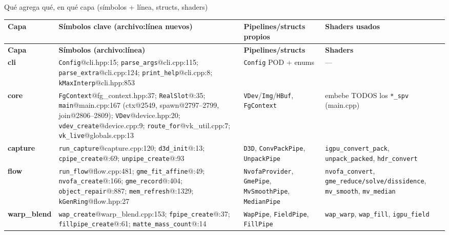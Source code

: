 \documentclass[aspectratio=169]{beamer}
\newcommand{\Lcli}[1]{\textcolor{cliCol}{\textbf{#1}}}
\newcommand{\Lcore}[1]{\textcolor{coreCol}{\textbf{#1}}}
\newcommand{\Lcap}[1]{\textcolor{capCol}{\textbf{#1}}}
\newcommand{\Lflow}[1]{\textcolor{flowCol}{\textbf{#1}}}
\newcommand{\Lwarp}[1]{\textcolor{warpCol}{\textbf{#1}}}
\begin{document}
\begin{frame}[allowframebreaks]{Qu\'e agrega qu\'e, en qu\'e capa (s\'imbolos + l\'inea, structs, shaders)}
\scriptsize
\setlength{\tabcolsep}{3pt}
\renewcommand{\arraystretch}{1.12}
\begin{longtable}{p{1.35cm} p{4.6cm} p{2.5cm} p{3.1cm}}
\toprule
\textbf{Capa} & \textbf{S\'imbolos clave (archivo:l\'inea nuevos)} & \textbf{Pipelines/structs propios} & \textbf{Shaders usados} \\
\midrule
\endfirsthead
\toprule
\textbf{Capa} & \textbf{S\'imbolos (archivo:l\'inea)} & \textbf{Pipelines/structs} & \textbf{Shaders} \\
\midrule
\endhead
\bottomrule
\endfoot

\Lcli{cli} &
\texttt{Config}@cli.hpp:15; \texttt{parse\_args}@cli.cpp:115; \texttt{parse\_extra}@cli.cpp:124; \texttt{print\_help}@cli.cpp:8; \texttt{kMaxInterp}@cli.hpp:853 &
\texttt{Config} POD + enums &
--- \\

\Lcore{core} &
\texttt{FgContext}@fg\_context.hpp:37; \texttt{RealSlot}@:35; \texttt{main}@main.cpp:167 (ctx@2549, spawn@2797--2799, join@2806--2809); \texttt{VDev}@device.hpp:20; \texttt{vdev\_create}@device.cpp:9; \texttt{route\_for}@vk\_util.cpp:7; \texttt{vk\_live}@globals.cpp:13 &
\texttt{VDev}/\texttt{Img}/\texttt{HBuf}, \texttt{FgContext} &
embebe TODOS los \texttt{*\_spv} (main.cpp) \\

\Lcap{capture} &
\texttt{run\_capture}@capture.cpp:120; \texttt{d3d\_init}@:13; \texttt{cpipe\_create}@:69; \texttt{unpipe\_create}@:93 &
\texttt{D3D}, \texttt{ConvPackPipe}, \texttt{UnpackPipe} &
\texttt{igpu\_convert\_pack}, \texttt{unpack\_packed}, \texttt{hdr\_convert} \\

\Lflow{flow} &
\texttt{run\_flow}@flow.cpp:481; \texttt{gme\_fit\_affine}@:49; \texttt{nvofa\_create}@:166; \texttt{gme\_record}@:404; \texttt{object\_repair}@:887; \texttt{mem\_refresh}@:1329; \texttt{kGenRing}@flow.hpp:27 &
\texttt{NvofaProvider}, \texttt{GmePipe}, \texttt{MvSmoothPipe}, \texttt{MedianPipe} &
\texttt{nvofa\_convert}, \texttt{gme\_reduce/solve/dissidence}, \texttt{mv\_smooth}, \texttt{mv\_median} \\

\Lwarp{warp\_blend} &
\texttt{wap\_create}@warp\_blend.cpp:153; \texttt{fpipe\_create}@:37; \texttt{fillpipe\_create}@:61; \texttt{matte\_mass\_count}@:14 &
\texttt{WapPipe}, \texttt{FieldPipe}, \texttt{FillPipe} &
\texttt{wap\_warp}, \texttt{wap\_fill}, \texttt{igpu\_field} \\


\end{longtable}
\end{frame}
\end{document}
